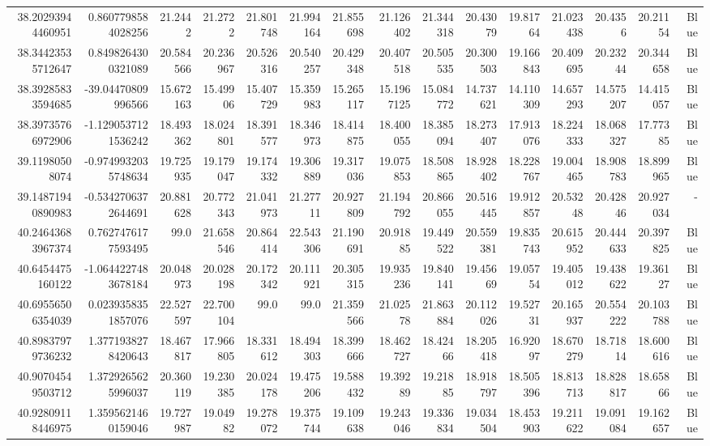 \begin{center}
\begin{longtable}{rrrrrrrrrrrrrrr}
38.20293944460951 & 0.8607798584028256 & 21.2442 & 21.2722 & 21.801748 & 21.994164 & 21.855698 & 21.126402 & 21.344318 & 20.43079 & 19.81764 & 21.023438 & 20.4356 & 20.21154 & Blue \\
38.34423535712647 & 0.8498264300321089 & 20.584566 & 20.236967 & 20.526316 & 20.540257 & 20.429348 & 20.407518 & 20.505535 & 20.300503 & 19.166843 & 20.409695 & 20.23244 & 20.344658 & Blue \\
38.39285833594685 & -39.04470809996566 & 15.672163 & 15.49906 & 15.407729 & 15.359983 & 15.265117 & 15.1967125 & 15.084772 & 14.737621 & 14.110309 & 14.657293 & 14.575207 & 14.415057 & Blue \\
38.39735766972906 & -1.1290537121536242 & 18.493362 & 18.024801 & 18.391577 & 18.346973 & 18.414875 & 18.400055 & 18.385094 & 18.273407 & 17.913076 & 18.224333 & 18.068327 & 17.77385 & Blue \\
39.11980508074 & -0.9749932035748634 & 19.725935 & 19.179047 & 19.174332 & 19.306889 & 19.317036 & 19.075853 & 18.508865 & 18.928402 & 18.228767 & 19.004465 & 18.908783 & 18.899965 & Blue \\
39.14871940890983 & -0.5342706372644691 & 20.881628 & 20.772343 & 21.041973 & 21.27711 & 20.927809 & 21.194792 & 20.866055 & 20.516445 & 19.912857 & 20.53248 & 20.42846 & 20.927034 & - \\
40.24643683967374 & 0.7627476177593495 & 99.0 & 21.658546 & 20.864414 & 22.543306 & 21.190691 & 20.91885 & 19.449522 & 20.559381 & 19.835743 & 20.615952 & 20.444633 & 20.397825 & Blue \\
40.6454475160122 & -1.0644227483678184 & 20.048973 & 20.028198 & 20.172342 & 20.111921 & 20.305315 & 19.935236 & 19.840141 & 19.45669 & 19.05754 & 19.405012 & 19.438622 & 19.36127 & Blue \\
40.69556506354039 & 0.0239358351857076 & 22.527597 & 22.700104 & 99.0 & 99.0 & 21.359566 & 21.02578 & 21.863884 & 20.112026 & 19.52731 & 20.165937 & 20.554222 & 20.103788 & Blue \\
40.89837979736232 & 1.3771938278420643 & 18.467817 & 17.966805 & 18.331612 & 18.494303 & 18.399666 & 18.462727 & 18.42466 & 18.205418 & 16.92097 & 18.670279 & 18.71814 & 18.600616 & Blue \\
40.90704549503712 & 1.3729265625996037 & 20.360119 & 19.230385 & 20.024178 & 19.475206 & 19.588432 & 19.39289 & 19.21885 & 18.918797 & 18.505396 & 18.813713 & 18.828817 & 18.65866 & Blue \\
40.92809118446975 & 1.3595621460159046 & 19.727987 & 19.04982 & 19.278072 & 19.375744 & 19.109638 & 19.243046 & 19.336834 & 19.034504 & 18.453903 & 19.211622 & 19.091084 & 19.162657 & Blue \\

\end{longtable}
\end{center}

